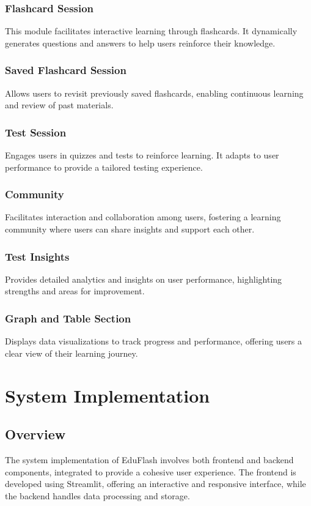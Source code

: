 \documentclass{report}
\begin{document}
\subsection{Flashcard Session}
This module facilitates interactive learning through flashcards. It dynamically generates questions and answers to help users reinforce their knowledge.

\subsection{Saved Flashcard Session}
Allows users to revisit previously saved flashcards, enabling continuous learning and review of past materials.

\subsection{Test Session}
Engages users in quizzes and tests to reinforce learning. It adapts to user performance to provide a tailored testing experience.

\subsection{Community}
Facilitates interaction and collaboration among users, fostering a learning community where users can share insights and support each other.

\subsection{Test Insights}
Provides detailed analytics and insights on user performance, highlighting strengths and areas for improvement.

\subsection{Graph and Table Section}
Displays data visualizations to track progress and performance, offering users a clear view of their learning journey.

\chapter{System Implementation}
\section{Overview}
The system implementation of EduFlash involves both frontend and backend components, integrated to provide a cohesive user experience. The frontend is developed using Streamlit, offering an interactive and responsive interface, while the backend handles data processing and storage.
\end{document}
